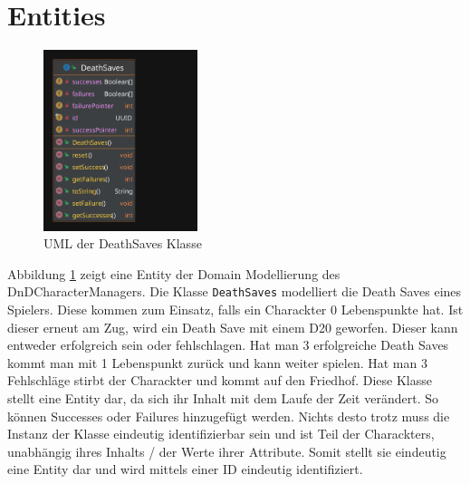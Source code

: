 \section{Entities}
\begin{figure}[H]
	\centering
	\includegraphics[width=0.4\textwidth]{Bilder/DeathSaves.pdf}
	\caption{UML der DeathSaves Klasse}
	\label{fig:DeathSaves}
\end{figure}
Abbildung \ref{fig:DeathSaves} zeigt eine Entity der Domain Modellierung des DnDCharacterManagers. Die Klasse \texttt{DeathSaves} modelliert die Death Saves eines Spielers. Diese kommen zum Einsatz, falls ein Charackter 0 Lebenspunkte hat. Ist dieser erneut am Zug, wird ein Death Save mit einem D20 geworfen. Dieser kann entweder erfolgreich sein oder fehlschlagen. Hat man 3 erfolgreiche Death Saves kommt man mit 1 Lebenspunkt zurück und kann weiter spielen. Hat man 3 Fehlschläge stirbt der Charackter und kommt auf den Friedhof. Diese Klasse stellt eine Entity dar, da sich ihr Inhalt mit dem Laufe der Zeit verändert. So können Successes oder Failures hinzugefügt werden. Nichts desto trotz muss die Instanz der Klasse eindeutig identifizierbar sein und ist Teil der Charackters, unabhängig ihres Inhalts / der Werte ihrer Attribute. Somit stellt sie eindeutig eine Entity dar und wird mittels einer ID eindeutig identifiziert.

